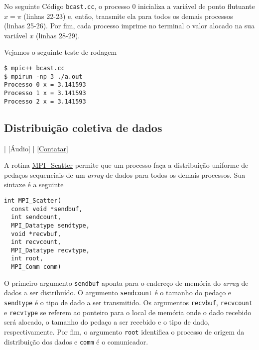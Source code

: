 \begin{ex}
  No seguinte Código \verb+bcast.cc+, o processo 0 inicializa a variável de ponto flutuante $x = \pi$ (linhas 22-23) e, então, transmite ela para todos os demais processos (linhas 25-26). Por fim, cada processo imprime no terminal o valor alocado na sua variável $x$ (linhas 28-29).



Vejamos o seguinte teste de rodagem
\begin{verbatim}
$ mpic++ bcast.cc
$ mpirun -np 3 ./a.out                                                           
Processo 0 x = 3.141593
Processo 1 x = 3.141593
Processo 2 x = 3.141593
\end{verbatim}
\end{ex}

\subsection {Distribuição coletiva de dados}

\begin{flushright}
  [Vídeo] | [Áudio] | \href{https://phkonzen.github.io/notas/contato.html}{[Contatar]}
\end{flushright}

A rotina \href{https://www.open-mpi.org/doc/current/man3/MPI\_Scatter.3.php}{MPI\_Scatter} permite que um processo faça a distribuição uniforme de pedaços sequenciais de um {\it array} de dados para todos os demais processos. Sua sintaxe é a seguinte
\begin{verbatim}
int MPI_Scatter(
  const void *sendbuf, 
  int sendcount, 
  MPI_Datatype sendtype,
  void *recvbuf, 
  int recvcount, 
  MPI_Datatype recvtype, 
  int root,
  MPI_Comm comm)
\end{verbatim}
O primeiro argumento \verb+sendbuf+ aponta para o endereço de memória do {\it array} de dados a ser distribuído. O argumento \verb+sendcount+ é o tamanho do pedaço e \verb+sendtype+ é o tipo de dado a ser transmitido. Os argumentos \verb+recvbuf+, \verb+recvcount+ e \verb+recvtype+ se referem ao ponteiro para o local de memória onde o dado recebido será alocado, o tamanho do pedaço a ser recebido e o tipo de dado, respectivamente. Por fim, o argumento \verb+root+ identifica o processo de origem da distribuição dos dados e \verb+comm+ é o comunicador.

